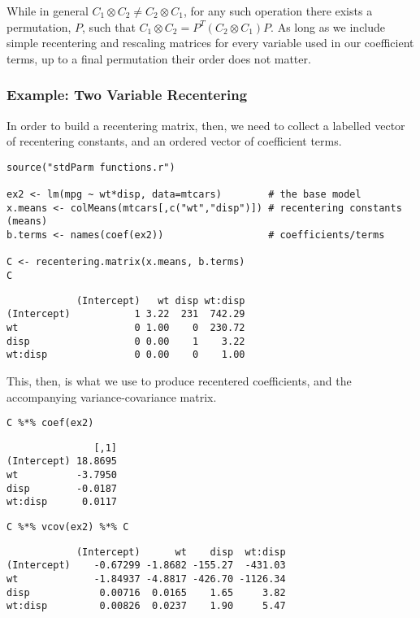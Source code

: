 \documentclass[]{article}
\begin{document}
While in general \(C_1 \otimes C_2 \neq C_2 \otimes C_1\), for any such
operation there exists a permutation, \(P\), such that
\(C_1 \otimes C_2 = P^T(C_2 \otimes C_1)P\). As long as we include
simple recentering and rescaling matrices for every variable used in our
coefficient terms, up to a final permutation their order does not
matter.

\hypertarget{example-two-variable-recentering}{%
\subsubsection{Example: Two Variable
Recentering}\label{example-two-variable-recentering}}

In order to build a recentering matrix, then, we need to collect a
labelled vector of recentering constants, and an ordered vector of
coefficient terms.

\begin{verbatim}
source("stdParm functions.r")

ex2 <- lm(mpg ~ wt*disp, data=mtcars)        # the base model
x.means <- colMeans(mtcars[,c("wt","disp")]) # recentering constants (means)
b.terms <- names(coef(ex2))                  # coefficients/terms

C <- recentering.matrix(x.means, b.terms)
C
\end{verbatim}

\begin{verbatim}
            (Intercept)   wt disp wt:disp
(Intercept)           1 3.22  231  742.29
wt                    0 1.00    0  230.72
disp                  0 0.00    1    3.22
wt:disp               0 0.00    0    1.00
\end{verbatim}

This, then, is what we use to produce recentered coefficients, and the
accompanying variance-covariance matrix.

\begin{verbatim}
C %*% coef(ex2)
\end{verbatim}

\begin{verbatim}
               [,1]
(Intercept) 18.8695
wt          -3.7950
disp        -0.0187
wt:disp      0.0117
\end{verbatim}

\begin{verbatim}
C %*% vcov(ex2) %*% C
\end{verbatim}

\begin{verbatim}
            (Intercept)      wt    disp  wt:disp
(Intercept)    -0.67299 -1.8682 -155.27  -431.03
wt             -1.84937 -4.8817 -426.70 -1126.34
disp            0.00716  0.0165    1.65     3.82
wt:disp         0.00826  0.0237    1.90     5.47
\end{verbatim}
\end{document}
